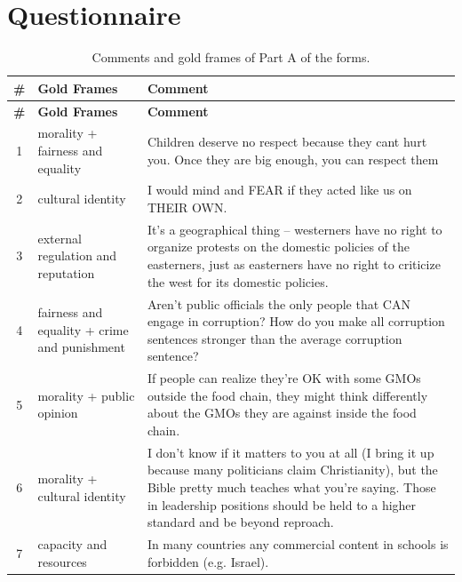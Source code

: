 \documentclass[
10pt, %
a4paper, %
oneside, %
headinclude,footinclude, %
] {book}%
\begin{document}
\section{Questionnaire}
\footnotesize
\renewcommand{\arraystretch}{1.15}

\begin{longtable}{|c|p{4cm}|p{8cm}|}
\caption{Comments and gold frames of Part A of the forms.}
\label{tab:questionnaire} \\

\hline
\textbf{\#} & \textbf{Gold Frames} & \textbf{Comment} \\ \hline
\endfirsthead

\hline
\textbf{\#} & \textbf{Gold Frames} & \textbf{Comment} \\ \hline
\endhead

1 & morality + fairness and equality & Children deserve no respect because they cant hurt you. Once they are big enough, you can respect them \\ \hline

2 & cultural identity & I would mind and FEAR if they acted like us on THEIR OWN. \\ \hline

3 & external regulation and reputation & It's a geographical thing -- westerners have no right to organize protests on the domestic policies of the easterners, just as easterners have no right to criticize the west for its domestic policies. \\ \hline

4 & fairness and equality + crime and punishment & Aren't public officials the only people that CAN engage in corruption? How do you make all corruption sentences stronger than the average corruption sentence? \\ \hline

5 & morality + public opinion & If people can realize they're OK with some GMOs outside the food chain, they might think differently about the GMOs they are against inside the food chain. \\ \hline

6 & morality + cultural identity & I don't know if it matters to you at all (I bring it up because many politicians claim Christianity), but the Bible pretty much teaches what you're saying. Those in leadership positions should be held to a higher standard and be beyond reproach. \\ \hline

7 & capacity and resources & In many countries any commercial content in schools is forbidden (e.g. Israel). \\ \hline


\end{longtable}
\end{document}
